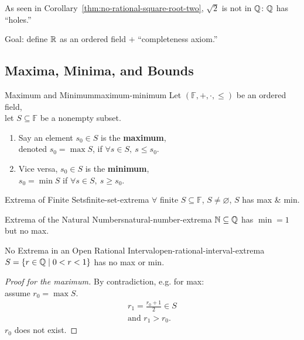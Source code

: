 \begin{thinking}[Motivation]
  As seen in Corollary~\ref{thm:no-rational-square-root-two}, $\sqrt{2}$ is not
  in $\mathbb{Q}$: $\mathbb{Q}$ has ``holes.''

  Goal: define $\mathbb{R}$ as an ordered field $+$
  ``completeness axiom.''
\end{thinking}

\subsection{Maxima, Minima, and Bounds}

\begin{definition}{Maximum and Minimum}{maximum-minimum}
  Let $(\mathbb{F},+,\cdot,\le)$ be an ordered field,\\
  let $S\subseteq\mathbb{F}$ be a nonempty subset.
  \begin{enumerate}[label=(\roman*)]
    \item Say an element $s_0\in S$ is the \textbf{maximum},\\
          denoted $s_0=\max S$, if $\forall s\in S,\ s\le s_0$.
    \item Vice versa, $s_0\in S$ is the \textbf{minimum},\\
          $s_0=\min S$ if $\forall s\in S,\ s\ge s_0$.
  \end{enumerate}
\end{definition}

\begin{theorem}{Extrema of Finite Sets}{finite-set-extrema}
  $\forall$ finite $S\subseteq\mathbb{F}$, $S\ne\varnothing$, $S$ has
  max \& min.
\end{theorem}

\begin{theorem}{Extrema of the Natural Numbers}{natural-number-extrema}
  $\mathbb{N}\subseteq\mathbb{Q}$ has $\min=1$
  but no max.
\end{theorem}

\begin{theorem}{No Extrema in an Open Rational Interval}{open-rational-interval-extrema}
  $S=\{r\in\mathbb{Q}\mid0<r<1\}$ has no max or min.
\end{theorem}

\begin{proof}[Proof for the maximum]
  By contradiction, e.g. for max:\\
  assume $r_0=\max S$.
  \begin{gather*}
    r_1=\frac{r_0+1}{2}\in S\\
    \text{and }r_1>r_0.
  \end{gather*}
  $r_0$ does not exist.
\end{proof}

